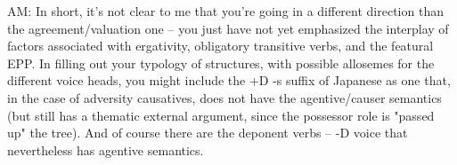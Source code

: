 AM:  In short, it's not clear to me that you're going in a different direction than the agreement/valuation one -- you just have not yet emphasized the interplay of factors associated with ergativity, obligatory transitive verbs, and the featural EPP.
In filling out your typology of structures, with possible allosemes for the different voice heads, you might include the +D -s suffix of Japanese as one that, in the case of adversity causatives, does not have the agentive/causer semantics (but still has a thematic external argument, since the possessor role is "passed up" the tree).
And of course there are the deponent verbs --  -D voice that nevertheless has agentive semantics.